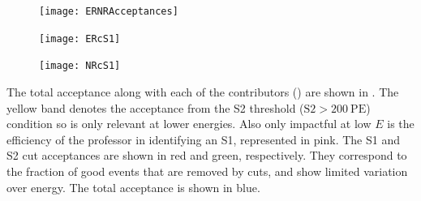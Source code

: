 \egroup

\begin{figure}
\centering
\texttt{[image: ERNRAcceptances]}
\label{fig:er_nr_calibrations_results_acceptances}
\end{figure}

\begin{figure}
\centering
\texttt{[image: ERcS1]}
\label{fig:er_nr_calibrations_results_er_cs1}
\end{figure}

\begin{figure}
\centering
\texttt{[image: NRcS1]}
\label{fig:er_nr_calibrations_results_nr_cs1}
\end{figure}

The total acceptance along with each of the contributors () are shown in
.  The yellow band denotes the acceptance from the S2 threshold
($\mathrm{S2} > 200\ \mathrm{PE}$) condition so is only relevant at lower energies.  Also only impactful at low $E$ is the efficiency of
the professor in identifying an S1, represented in pink.  The S1 and S2 cut acceptances are shown in red and green, respectively.  They
correspond to the fraction of good events that are removed by cuts, and show limited variation over energy.  The total acceptance is
shown in blue.

